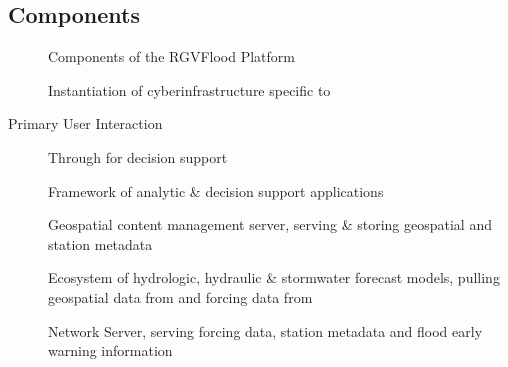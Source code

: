 \documentclass[letterpaper,12pt,english]{book}
\begin{document}
\subsection{Components}
\label{\detokenize{predevelopment/components/index:components}}\label{\detokenize{predevelopment/components/index::doc}}
\begin{figure}[htbp]
\centering
\capstart

\noindent{}
\caption{Components of the RGVFlood Platform}\label{\detokenize{predevelopment/components/index:id1}}\end{figure}
\begin{description}
\item[{{\hyperref[\detokenize{glossary:term-RGVFlood}]{}}}] \leavevmode
\sphinxAtStartPar
Instantiation of {\hyperref[\detokenize{glossary:term-REON}]{}} cyberinfrastructure specific to {\hyperref[\detokenize{glossary:term-LRGV}]{}}

\item[{Primary User Interaction}] \leavevmode
\sphinxAtStartPar
Through {\hyperref[\detokenize{glossary:term-REON.cc}]{}} for decision support

\item[{{\hyperref[\detokenize{glossary:term-REON.cc}]{}}}] \leavevmode
\sphinxAtStartPar
Framework of {\hyperref[\detokenize{glossary:term-REON}]{}} analytic \& decision support applications

\item[{{\hyperref[\detokenize{glossary:term-GeoNode}]{}}}] \leavevmode
\sphinxAtStartPar
Geospatial content management server, serving \& storing geospatial and {\hyperref[\detokenize{glossary:term-RTHS}]{}} station metadata

\item[{{\hyperref[\detokenize{glossary:term-REON-WM}]{}}}] \leavevmode
\sphinxAtStartPar
Ecosystem of hydrologic, hydraulic \& stormwater forecast models, pulling geospatial data from {\hyperref[\detokenize{glossary:term-GeoNode}]{}} and forcing data from {\hyperref[\detokenize{glossary:term-RTHS.us}]{}}

\item[{{\hyperref[\detokenize{glossary:term-RTHS.us}]{}}}] \leavevmode
\sphinxAtStartPar
{\hyperref[\detokenize{glossary:term-RTHS}]{}} Network Server, serving forcing data, station metadata and flood early warning information

\end{description}
\end{document}
